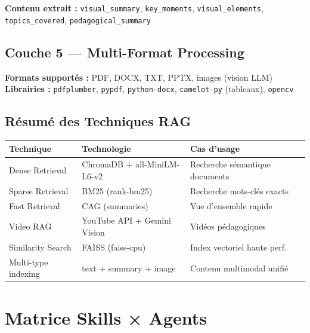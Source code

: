 \documentclass[12pt,a4paper]{article}
\begin{document}
\textbf{Contenu extrait :} \texttt{visual\_summary}, \texttt{key\_moments}, \texttt{visual\_elements}, \texttt{topics\_covered}, \texttt{pedagogical\_summary}

\subsection{Couche 5 --- Multi-Format Processing}

\textbf{Formats supportés :} PDF, DOCX, TXT, PPTX, images (vision LLM)\\
\textbf{Librairies :} \texttt{pdfplumber}, \texttt{pypdf}, \texttt{python-docx}, \texttt{camelot-py} (tableaux), \texttt{opencv}

\subsection{Résumé des Techniques RAG}

\begin{longtable}{llll}
\toprule
\textbf{Technique} & \textbf{Technologie} & \textbf{Cas d'usage} \\
\midrule
Dense Retrieval & ChromaDB + all-MiniLM-L6-v2 & Recherche sémantique documents \\
Sparse Retrieval & BM25 (rank-bm25) & Recherche mots-clés exacts \\
Fast Retrieval & CAG (summaries) & Vue d'ensemble rapide \\
Video RAG & YouTube API + Gemini Vision & Vidéos pédagogiques \\
Similarity Search & FAISS (faiss-cpu) & Index vectoriel haute perf. \\
Multi-type indexing & text + summary + image & Contenu multimodal unifié \\
\bottomrule
\end{longtable}

\section{Matrice Skills × Agents}
\end{document}
